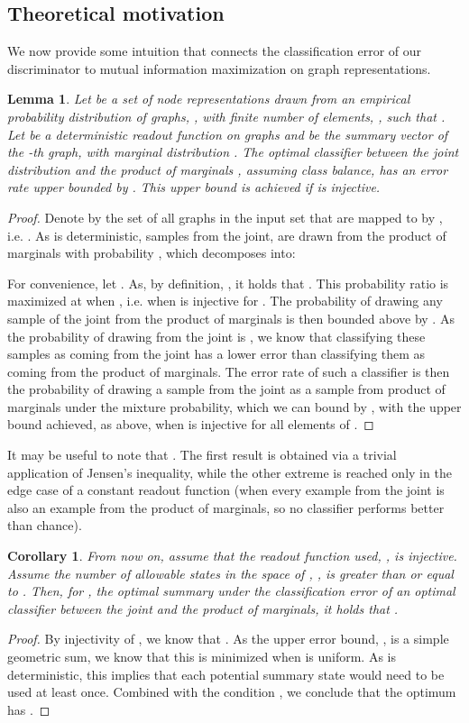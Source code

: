 \documentclass{article} \usepackage{iclr2019_conference,times}
\newtheorem{lemma}{Lemma}
\newtheorem{cor}{Corollary}
\begin{document}
\subsection{Theoretical motivation}

We now provide some intuition that connects the classification error of our discriminator to mutual information maximization on graph representations.

\begin{lemma}
Let  be a set of node representations drawn from an empirical probability distribution of graphs, , with finite number of elements, , such that .
Let  be a deterministic readout function on graphs and  be the summary vector of the -th graph, with marginal distribution .
The optimal classifier between the joint distribution  and the product of marginals , assuming class balance, has an error rate upper bounded by . This upper bound is achieved if  is injective.
\label{lemma}
\end{lemma}
\begin{proof}
Denote by  the set of all graphs in the input set that are mapped to  by , i.e. . As  is deterministic, samples from the joint,  are drawn from the product of marginals with probability , which decomposes into:

For convenience, let . As, by definition, , it holds that . This probability ratio is maximized at  when , i.e. when  is injective for .
The probability of drawing any sample of the joint from the product of marginals is then bounded above by . 
As the probability of drawing  from the joint is , we know that classifying these samples as coming from the joint has a lower error than classifying them as coming from the product of marginals.
The error rate of such a classifier is then the probability of drawing a sample from the joint as a sample from product of marginals under the mixture probability, which we can bound by , with the upper bound achieved, as above, when  is injective for all elements of .
\end{proof}
It may be useful to note that . The first result is obtained via a trivial application of Jensen's inequality, while the other extreme is reached only in the edge case of a constant readout function (when every example from the joint is also an example from the product of marginals, so no classifier performs better than chance).
\begin{cor}
From now on, assume that the readout function used, , is injective. Assume the number of allowable states in the space of , , is greater than or equal to . Then, for , the optimal summary under the classification error of an optimal classifier between the joint and the product of marginals, it holds that .
\end{cor}
\begin{proof}
By injectivity of , we know that .
As the upper error bound, , is a simple geometric sum, we know that this is minimized when  is uniform.
As  is deterministic, this implies that each potential summary state would need to be used at least once. Combined with the condition , we conclude that the optimum has .
\end{proof}
\end{document}
